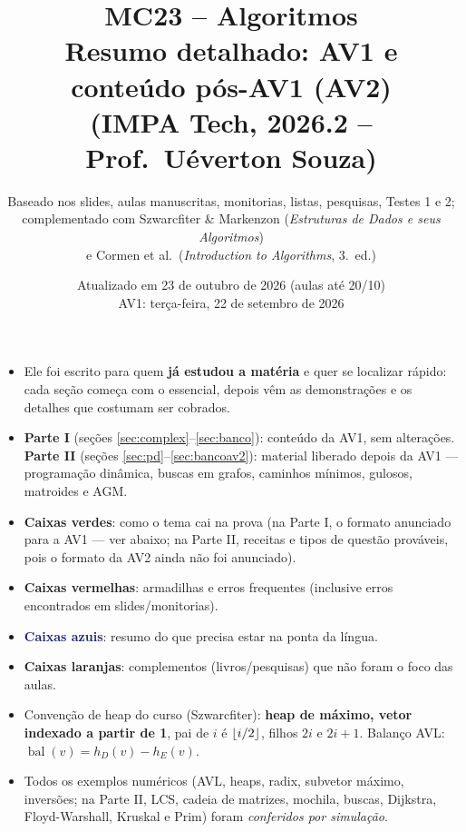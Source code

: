 \documentclass[11pt,a4paper]{article}
\title{\textbf{MC23 -- Algoritmos}\\[4pt]
\large Resumo detalhado: AV1 e conteúdo pós-AV1 (AV2)\\
(IMPA Tech, 2026.2 -- Prof.\ Uéverton Souza)}
\author{Baseado nos slides, aulas manuscritas, monitorias, listas, pesquisas, Testes 1 e 2;\\
complementado com Szwarcfiter \& Markenzon (\emph{Estruturas de Dados e seus Algoritmos})\\
e Cormen et al.\ (\emph{Introduction to Algorithms}, 3.\ ed.)}
\date{Atualizado em 23 de outubro de 2026 (aulas até 20/10)\\ AV1: terça-feira, 22 de setembro de 2026}
\newcommand{\bal}{\operatorname{bal}}
\DeclarePairedDelimiter{\floor}{\lfloor}{\rfloor}
\theoremstyle{plain}
\theoremstyle{definition}
\theoremstyle{remark}
\numberwithin{equation}{section}
\begin{document}
\maketitle

\begin{chave}
\begin{itemize}
  \item Ele foi escrito para quem \textbf{já estudou a matéria} e quer se localizar rápido: cada seção começa com o essencial, depois vêm as demonstrações e os detalhes que costumam ser cobrados.
  \item \textbf{Parte I} (seções \ref{sec:complex}--\ref{sec:banco}): conteúdo da AV1, sem alterações. \textbf{Parte II} (seções \ref{sec:pd}--\ref{sec:bancoav2}): material liberado depois da AV1 --- programação dinâmica, buscas em grafos, caminhos mínimos, gulosos, matroides e AGM.
  \item \textcolor{ForestGreen!70!black}{\textbf{Caixas verdes}}: como o tema cai na prova (na Parte I, o formato anunciado para a AV1 --- ver abaixo; na Parte II, receitas e tipos de questão prováveis, pois o formato da AV2 ainda não foi anunciado).
  \item \textcolor{BrickRed!75!black}{\textbf{Caixas vermelhas}}: armadilhas e erros frequentes (inclusive erros encontrados em slides/monitorias).
  \item \textcolor{MidnightBlue}{\textbf{Caixas azuis}}: resumo do que precisa estar na ponta da língua.
  \item \textcolor{orange!70!black}{\textbf{Caixas laranjas}}: complementos (livros/pesquisas) que não foram o foco das aulas.
  \item Convenção de heap do curso (Szwarcfiter): \textbf{heap de máximo, vetor indexado a partir de 1}, pai de $i$ é $\floor{i/2}$, filhos $2i$ e $2i+1$. Balanço AVL: $\bal(v)=h_D(v)-h_E(v)$.
  \item Todos os exemplos numéricos (AVL, heaps, radix, subvetor máximo, inversões; na Parte II, LCS, cadeia de matrizes, mochila, buscas, Dijkstra, Floyd-Warshall, Kruskal e Prim) foram \emph{conferidos por simulação}.
\end{itemize}
\end{chave}
\end{document}
